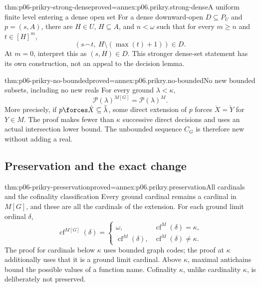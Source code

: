 \begin{hblemma}{thm:p06-prikry-strong-dense}{proved=annex:p06.prikry.strong-dense}{A uniform finite level entering a dense open set}
For a dense downward-open \(D\subseteq P_U\) and \(p=(s,A)\), there
are \(H\in U\), \(H\subseteq A\), and \(n<\omega\) such that
for every \(m\geq n\) and \(t\in[H]^m\),
\[
 (s\mathbin{\frown}t,\ H\setminus(\max(t)+1))\in D.
\]
At \(m=0\), interpret this as \((s,H)\in D\). This stronger dense-set
statement has its own construction, not an appeal to the decision lemma.
\end{hblemma}

\begin{hbtheorem}{thm:p06-prikry-no-bounded}{proved=annex:p06.prikry.no-bounded}{No new bounded subsets, including no new reals}
For every ground \(\lambda<\kappa\),
\[
 \mathcal P(\lambda)^{M[G]}=\mathcal P(\lambda)^M.
\]
More precisely, if \(p\forces\dot X\subseteq\check\lambda\), some
direct extension of \(p\) forces \(\dot X=\check Y\) for \(Y\in M\).
The proof makes fewer than \(\kappa\) successive direct decisions and
uses an actual intersection lower bound. The unbounded sequence \(C_G\)
is therefore new without adding a real.
\end{hbtheorem}

\subsection{Preservation and the exact change}

\begin{hbtheorem}{thm:p06-prikry-preservation}{proved=annex:p06.prikry.preservation}{All cardinals and the cofinality classification}
Every ground cardinal remains a cardinal in \(M[G]\), and these are all
the cardinals of the extension. For each ground limit ordinal \(\delta\),
\[
 \operatorname{cf}^{M[G]}(\delta)=
 \begin{cases}
 \omega,&\operatorname{cf}^{M}(\delta)=\kappa,\\
 \operatorname{cf}^{M}(\delta),&\operatorname{cf}^{M}(\delta)\ne\kappa.
 \end{cases}
\]
The proof for cardinals below \(\kappa\) uses bounded graph codes; the
proof at \(\kappa\) additionally uses that it is a ground limit cardinal.
Above \(\kappa\), maximal antichains bound the possible values of a
function name. Cofinality \(\kappa\), unlike cardinality \(\kappa\),
is deliberately not preserved.
\end{hbtheorem}

